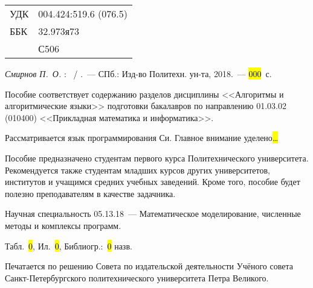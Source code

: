 


\noindent
\begin{tabular}{ll}
УДК & 004.424:519.6 (076.5)\\
ББК & 32.973я73\\
    & С506 \\
\end{tabular}

\vskip1cm

\textit{Смирнов П.~О.} \textbf{\@title}: \MakeLowercase{\@subtitle}~/ \@author.~---
СПб.: Изд-во Политехн. ун-та, 2018.~--- \hl{000}~с.
\vskip1cm

Пособие соответствует 
содержанию разделов дисциплины <<Алгоритмы и алгоритмические языки>>
подготовки бакалавров по направлению 01.03.02 (010400) <<Прикладная математика
и информатика>>.

Рассматривается язык программирования Си. Главное внимание уделено\hl{\dots}

Пособие предназначено студентам первого курса Политехнического университета.
Рекомендуется также студентам младших курсов других университетов, институтов
и учащимся средних учебных заведений. Кроме того, пособие будет полезно
преподавателям в качестве задачника.

Научная специальность 05.13.18~--- Математическое моделирование, численные
методы и комплексы программ.

\vskip1cm

Табл.~\hl{0}, Ил.~\hl{0}, Библиогр.:~\hl{0} назв.

\vskip1cm

Печатается по решению Совета по издательской деятельности Учёного совета
Санкт-Петербургского политехнического университета Петра Великого.

